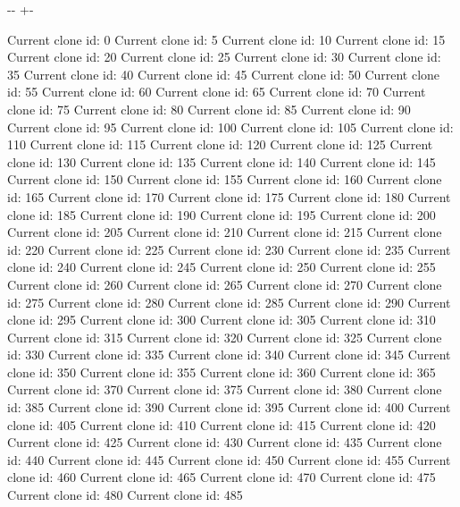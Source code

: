 \documentclass[letterpaper,10pt,english]{sphinxmanual}
\newlength\nbsphinxcodecellspacing
\begin{document}
{

\kern-\sphinxverbatimsmallskipamount\kern-\baselineskip
\kern+\FrameHeightAdjust\kern-\fboxrule
\vspace{\nbsphinxcodecellspacing}

\begin{sphinxVerbatim}[commandchars=\\\{\}]
Current clone id: 0
Current clone id: 5
Current clone id: 10
Current clone id: 15
Current clone id: 20
Current clone id: 25
Current clone id: 30
Current clone id: 35
Current clone id: 40
Current clone id: 45
Current clone id: 50
Current clone id: 55
Current clone id: 60
Current clone id: 65
Current clone id: 70
Current clone id: 75
Current clone id: 80
Current clone id: 85
Current clone id: 90
Current clone id: 95
Current clone id: 100
Current clone id: 105
Current clone id: 110
Current clone id: 115
Current clone id: 120
Current clone id: 125
Current clone id: 130
Current clone id: 135
Current clone id: 140
Current clone id: 145
Current clone id: 150
Current clone id: 155
Current clone id: 160
Current clone id: 165
Current clone id: 170
Current clone id: 175
Current clone id: 180
Current clone id: 185
Current clone id: 190
Current clone id: 195
Current clone id: 200
Current clone id: 205
Current clone id: 210
Current clone id: 215
Current clone id: 220
Current clone id: 225
Current clone id: 230
Current clone id: 235
Current clone id: 240
Current clone id: 245
Current clone id: 250
Current clone id: 255
Current clone id: 260
Current clone id: 265
Current clone id: 270
Current clone id: 275
Current clone id: 280
Current clone id: 285
Current clone id: 290
Current clone id: 295
Current clone id: 300
Current clone id: 305
Current clone id: 310
Current clone id: 315
Current clone id: 320
Current clone id: 325
Current clone id: 330
Current clone id: 335
Current clone id: 340
Current clone id: 345
Current clone id: 350
Current clone id: 355
Current clone id: 360
Current clone id: 365
Current clone id: 370
Current clone id: 375
Current clone id: 380
Current clone id: 385
Current clone id: 390
Current clone id: 395
Current clone id: 400
Current clone id: 405
Current clone id: 410
Current clone id: 415
Current clone id: 420
Current clone id: 425
Current clone id: 430
Current clone id: 435
Current clone id: 440
Current clone id: 445
Current clone id: 450
Current clone id: 455
Current clone id: 460
Current clone id: 465
Current clone id: 470
Current clone id: 475
Current clone id: 480
Current clone id: 485

\end{sphinxVerbatim}}
\end{document}
